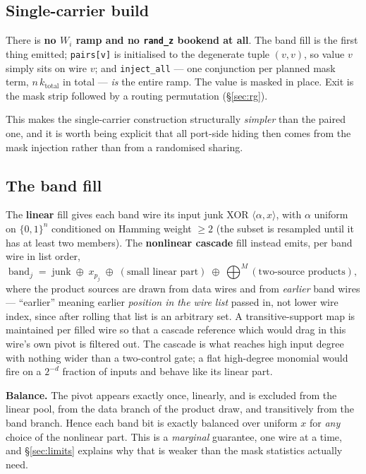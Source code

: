 \documentclass[11pt]{article}
\newcommand{\xor}{\oplus}
\newcommand{\code}[1]{\texttt{#1}}
\begin{document}
\subsection{Single-carrier build}

There is \textbf{no $W_i$ ramp and no \code{rand\_z} bookend at all}. The band
fill is the first thing emitted; \code{pairs[v]} is initialised to the
degenerate tuple $(v,v)$, so value $v$ simply sits on wire $v$; and
\code{inject\_all} --- one conjunction per planned mask term, $n\,k_{\mathrm{total}}$
in total --- \emph{is} the entire ramp. The value is masked in place. Exit is
the mask strip followed by a routing permutation (\S\ref{sec:rg}).

This makes the single-carrier construction structurally \emph{simpler} than the
paired one, and it is worth being explicit that all port-side hiding then comes
from the mask injection rather than from a randomised sharing.

\subsection{The band fill}

The \textbf{linear} fill gives each band wire its input junk XOR
$\langle\alpha,x\rangle$, with $\alpha$ uniform on $\{0,1\}^n$ conditioned on
Hamming weight $\ge 2$ (the subset is resampled until it has at least two
members). The \textbf{nonlinear cascade} fill instead emits, per band wire in
list order,
\[
\text{band}_j \;=\; \text{junk} \;\xor\; x_{p_j} \;\xor\; (\text{small linear part}) \;\xor\; \bigoplus^{M} (\text{two-source products}),
\]
where the product sources are drawn from data wires and from \emph{earlier}
band wires --- ``earlier'' meaning earlier \emph{position in the wire list}
passed in, not lower wire index, since after rolling that list is an arbitrary
set. A transitive-support map is maintained per filled wire so that a cascade
reference which would drag in this wire's own pivot is filtered out. The
cascade is what reaches high input degree with nothing wider than a two-control
gate; a flat high-degree monomial would fire on a $2^{-d}$ fraction of inputs
and behave like its linear part.

\textbf{Balance.} The pivot appears exactly once, linearly, and is excluded
from the linear pool, from the data branch of the product draw, and
transitively from the band branch. Hence each band bit is exactly balanced over
uniform $x$ for \emph{any} choice of the nonlinear part. This is a
\emph{marginal} guarantee, one wire at a time, and \S\ref{sec:limits} explains
why that is weaker than the mask statistics actually need.
\end{document}
